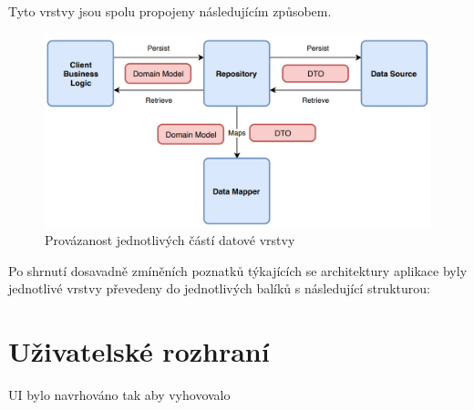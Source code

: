 \bigskip

Tyto vrstvy jsou spolu propojeny následujícím způsobem.

\begin{figure}[H]
  \centering
  \includegraphics[width=.8\textwidth]{arch_diagram.png}
  \caption{Provázanost jednotlivých částí datové vrstvy}
  \label{fig:arch_diagram}
\end{figure}

\bigskip

Po shrnutí dosavadně zmíněních poznatků týkajících se architektury aplikace byly jednotlivé vrstvy převedeny do jednotlivých balíků s následující
strukturou:

\bigskip






\section{Uživatelské rozhraní}
UI bylo navrhováno tak aby vyhovovalo 

